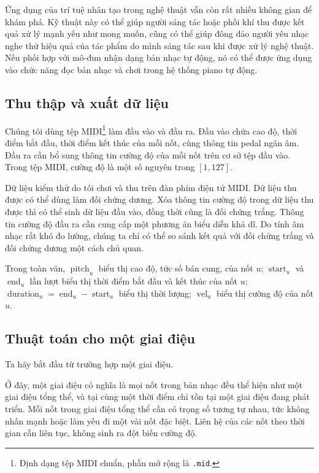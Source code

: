 \documentclass[11pt]{article}
\begin{document}
Ứng dụng của trí tuệ nhân tạo trong nghệ thuật vẫn còn rất nhiều không gian
để khám phá. Kỹ thuật này có thể giúp người sáng tác hoặc phối khí thu được
kết quả xử lý mạnh yếu như mong muốn, cũng có thể giúp đông đảo người yêu
nhạc nghe thử hiệu quả của tác phẩm do mình sáng tác sau khi được xử lý nghệ
thuật. Nếu phối hợp với mô-đun nhận dạng bản nhạc tự động, nó có thể được ứng
dụng vào chức năng đọc bản nhạc và chơi trong hệ thống piano tự động.

\subsection{Thu thập và xuất dữ liệu}

Chúng tôi dùng tệp MIDI\footnote{Định dạng tệp MIDI chuẩn, phần mở rộng là
\texttt{.mid}.} làm đầu vào và đầu ra. Đầu vào chứa cao độ, thời điểm bắt đầu,
thời điểm kết thúc của mỗi nốt, cùng thông tin pedal ngân âm. Đầu ra cần bổ
sung thông tin cường độ của mỗi nốt trên cơ sở tệp đầu vào. Trong tệp MIDI,
cường độ là một số nguyên trong \([1,127]\).

Dữ liệu kiểm thử do tôi chơi và thu trên đàn phím điện tử MIDI. Dữ liệu thu
được có thể dùng làm đối chứng dương. Xóa thông tin cường độ trong dữ liệu thu
được thì có thể sinh dữ liệu đầu vào, đồng thời cũng là đối chứng trắng. Thông
tin cường độ đầu ra cần cung cấp một phương án biểu diễn khả dĩ. Do tính âm
nhạc rất khó đo lường, chúng ta chỉ có thể so sánh kết quả với đối chứng trắng
và đối chứng dương một cách chủ quan.

Trong toàn văn, \(\operatorname{pitch}_u\) biểu thị cao độ, tức số bán cung,
của nốt \(u\); \(\operatorname{start}_u\) và \(\operatorname{end}_u\) lần lượt
biểu thị thời điểm bắt đầu và kết thúc của nốt \(u\);
\(\operatorname{duration}_u=\operatorname{end}_u-\operatorname{start}_u\)
biểu thị thời lượng; \(\operatorname{vel}_u\) biểu thị cường độ của nốt \(u\).

\subsection{Thuật toán cho một giai điệu}

Ta hãy bắt đầu từ trường hợp một giai điệu.

Ở đây, một giai điệu có nghĩa là mọi nốt trong bản nhạc đều thể hiện như một
giai điệu tổng thể, và tại cùng một thời điểm chỉ tồn tại một giai điệu đang
phát triển. Mỗi nốt trong giai điệu tổng thể cần có trọng số tương tự nhau,
tức không nhấn mạnh hoặc làm yếu đi một vài nốt đặc biệt. Liên hệ của các nốt
theo thời gian cần liên tục, không sinh ra đột biến cường độ.
\end{document}
